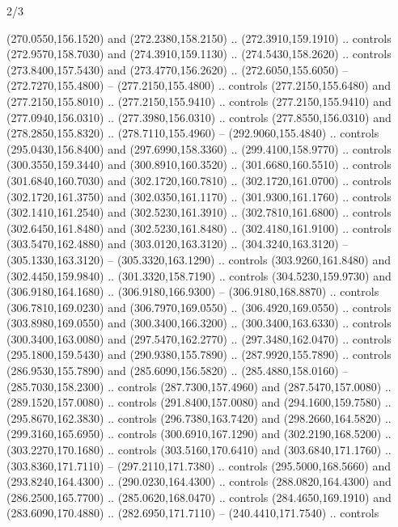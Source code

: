 \begin{flagdescription}{2/3}
\begin{scope}[xshift=0.5\flaglength,yshift=0.5\flagwidth,scale=\flagwidth/259.2]
\begin{scope}[y=0.8pt, x=0.8pt, yscale=-1,shift={(-243,-162)}]
      (270.0550,156.1520) and (272.2380,158.2150) .. (272.3910,159.1910) .. controls
      (272.9570,158.7030) and (274.3910,159.1130) .. (274.5430,158.2620) .. controls
      (273.8400,157.5430) and (273.4770,156.2620) .. (272.6050,155.6050) --
      (272.7270,155.4800) -- (277.2150,155.4800) .. controls (277.2150,155.6480) and
      (277.2150,155.8010) .. (277.2150,155.9410) .. controls (277.2150,155.9410) and
      (277.0940,156.0310) .. (277.3980,156.0310) .. controls (277.8550,156.0310) and
      (278.2850,155.8320) .. (278.7110,155.4960) -- (292.9060,155.4840) .. controls
      (295.0430,156.8400) and (297.6990,158.3360) .. (299.4100,158.9770) .. controls
      (300.3550,159.3440) and (300.8910,160.3520) .. (301.6680,160.5510) .. controls
      (301.6840,160.7030) and (302.1720,160.7810) .. (302.1720,161.0700) .. controls
      (302.1720,161.3750) and (302.0350,161.1170) .. (301.9300,161.1760) .. controls
      (302.1410,161.2540) and (302.5230,161.3910) .. (302.7810,161.6800) .. controls
      (302.6450,161.8480) and (302.5230,161.8480) .. (302.4180,161.9100) .. controls
      (303.5470,162.4880) and (303.0120,163.3120) .. (304.3240,163.3120) --
      (305.1330,163.3120) -- (305.3320,163.1290) .. controls (303.9260,161.8480) and
      (302.4450,159.9840) .. (301.3320,158.7190) .. controls (304.5230,159.9730) and
      (306.9180,164.1680) .. (306.9180,166.9300) -- (306.9180,168.8870) .. controls
      (306.7810,169.0230) and (306.7970,169.0550) .. (306.4920,169.0550) .. controls
      (303.8980,169.0550) and (300.3400,166.3200) .. (300.3400,163.6330) .. controls
      (300.3400,163.0080) and (297.5470,162.2770) .. (297.3480,162.0470) .. controls
      (295.1800,159.5430) and (290.9380,155.7890) .. (287.9920,155.7890) .. controls
      (286.9530,155.7890) and (285.6090,156.5820) .. (285.4880,158.0160) --
      (285.7030,158.2300) .. controls (287.7300,157.4960) and (287.5470,157.0080) ..
      (289.1520,157.0080) .. controls (291.8400,157.0080) and (294.1600,159.7580) ..
      (295.8670,162.3830) .. controls (296.7380,163.7420) and (298.2660,164.5820) ..
      (299.3160,165.6950) .. controls (300.6910,167.1290) and (302.2190,168.5200) ..
      (303.2270,170.1680) .. controls (303.5160,170.6410) and (303.6840,171.1760) ..
      (303.8360,171.7110) -- (297.2110,171.7380) .. controls (295.5000,168.5660) and
      (293.8240,164.4300) .. (290.0230,164.4300) .. controls (288.0820,164.4300) and
      (286.2500,165.7700) .. (285.0620,168.0470) .. controls (284.4650,169.1910) and
      (283.6090,170.4880) .. (282.6950,171.7110) -- (240.4410,171.7540) .. controls

\end{scope}
\end{scope}
\end{flagdescription}
